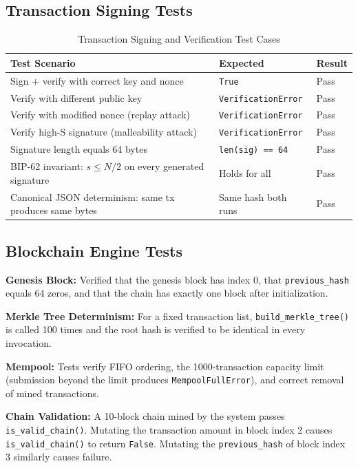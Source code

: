 \documentclass[12pt,a4paper]{report}
\begin{document}
\subsection{Transaction Signing Tests}

\begin{table}[H]
\centering
\caption{Transaction Signing and Verification Test Cases}
\label{tab:signing_tests}
\begin{tabular}{|p{6cm}|l|l|}
\hline
\textbf{Test Scenario} & \textbf{Expected} & \textbf{Result} \\
\hline
Sign + verify with correct key and nonce & \texttt{True} & Pass \\
\hline
Verify with different public key & \texttt{VerificationError} & Pass \\
\hline
Verify with modified nonce (replay attack) & \texttt{VerificationError} & Pass \\
\hline
Verify high-S signature (malleability attack) & \texttt{VerificationError} & Pass \\
\hline
Signature length equals 64 bytes & \texttt{len(sig) == 64} & Pass \\
\hline
BIP-62 invariant: $s \leq N/2$ on every generated signature & Holds for all & Pass \\
\hline
Canonical JSON determinism: same tx produces same bytes & Same hash both runs & Pass \\
\hline
\end{tabular}
\end{table}

\subsection{Blockchain Engine Tests}

\textbf{Genesis Block:} Verified that the genesis block has index 0, that
\texttt{previous\_hash} equals 64 zeros, and that the chain has exactly one block
after initialization.

\textbf{Merkle Tree Determinism:} For a fixed transaction list, \texttt{build\_merkle\_tree()}
is called 100 times and the root hash is verified to be identical in every invocation.

\textbf{Mempool:} Tests verify FIFO ordering, the 1000-transaction capacity limit
(submission beyond the limit produces \texttt{MempoolFullError}), and correct removal
of mined transactions.

\textbf{Chain Validation:} A 10-block chain mined by the system passes
\texttt{is\_valid\_chain()}. Mutating the transaction amount in block index 2 causes
\texttt{is\_valid\_chain()} to return \texttt{False}. Mutating the \texttt{previous\_hash}
of block index 3 similarly causes failure.
\end{document}
